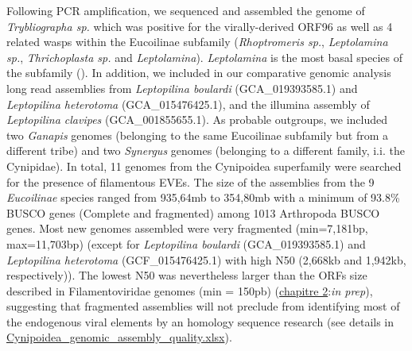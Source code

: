 Following PCR amplification, we sequenced and assembled the genome of \textit{Trybliographa sp.} which was positive for the virally-derived ORF96 as well as 4 related wasps within the Eucoilinae subfamily (\textit{Rhoptromeris sp.}, \textit{Leptolamina sp.}, \textit{Thrichoplasta sp.} and  \textit{Leptolamina}). \textit{Leptolamina} is the most basal species of the subfamily (\citep{blaimer_comprehensive_2020}). In addition, we included in our comparative genomic analysis long read assemblies from \textit{Leptopilina boulardi} (GCA\_019393585.1) and \textit{Leptopilina heterotoma} (GCA\_015476425.1), and the illumina assembly of \textit{Leptopilina clavipes} (GCA\_001855655.1). As probable outgroups, we included two \textit{Ganapis} genomes (belonging to the same Eucoilinae subfamily but from a different tribe) and two \textit{Synergus} genomes (belonging to a different family, i.i. the Cynipidae). In total, 11 genomes from the Cynipoidea superfamily were searched for the presence of filamentous EVEs. The size of the assemblies from the 9 \textit{Eucoilinae} species ranged from 935,64mb to 354,80mb with a minimum of 93.8\% BUSCO genes (Complete and fragmented) among 1013 Arthropoda BUSCO genes. Most new genomes assembled were very fragmented (min=7,181bp, max=11,703bp) (except for \textit{Leptopilina boulardi} (GCA\_019393585.1) and \textit{Leptopilina heterotoma} (GCF\_015476425.1) with high N50 (2,668kb and 1,942kb, respectively)). The lowest N50 was nevertheless larger than the ORFs size described in Filamentoviridae genomes (min = 150pb) \citep{lepetit_genome_2017}(\hyperref[sec:chap2]{chapitre 2}:\textit{in prep}), suggesting that fragmented assemblies will not preclude from identifying most of the endogenous viral elements by an homology sequence research (see details in \href{https://github.com/BenjaminGuinet/PhD_defense/blob/main/Supplementary_paper3/Cynipoidea_genomic_assembly_quality.xlsx}{Cynipoidea\_genomic\_assembly\_quality.xlsx}).




